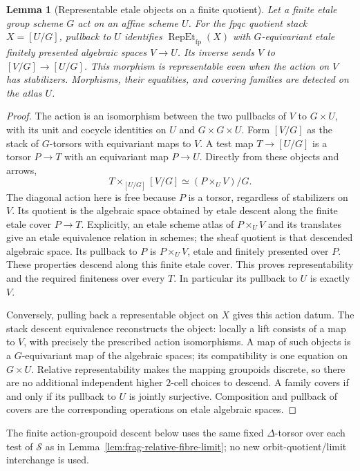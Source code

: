 \documentclass[11pt]{article}
\newtheorem{lemma}[theorem]{Lemma}
\theoremstyle{definition}
\theoremstyle{remark}
\begin{document}
\begin{lemma}[Representable etale objects on a finite quotient]
\label{lem:frag-finite-quotient-etale-descent}
Let a finite etale group scheme $G$ act on an affine scheme $U$.
For the fpqc quotient stack $X=[U/G]$, pullback to $U$ identifies
$\operatorname{RepEt}_{\mathrm{fp}}(X)$ with $G$-equivariant etale
finitely presented algebraic spaces $V\to U$.  Its inverse sends
$V$ to $[V/G]\to[U/G]$.  This morphism is representable even when
the action on $V$ has stabilizers.  Morphisms, their equalities,
and covering families are detected on the atlas $U$.
\end{lemma}
\begin{proof}
The action is an isomorphism between the two pullbacks of $V$ to
$G\times U$, with its unit and cocycle identities on $U$ and
$G\times G\times U$.  Form $[V/G]$ as the stack of $G$-torsors
with equivariant maps to $V$.  A test map $T\to[U/G]$ is a torsor
$P\to T$ with an equivariant map $P\to U$.  Directly from these
objects and arrows,
\[
 T\times_{[U/G]}[V/G]\simeq (P\times_U V)/G.
\]
The diagonal action here is free because $P$ is a torsor, regardless
of stabilizers on $V$.  Its quotient is the algebraic space obtained
by etale descent along the finite etale cover $P\to T$.
Explicitly, an etale scheme atlas of $P\times_UV$ and its translates
give an etale equivalence relation in schemes; the sheaf quotient
is that descended algebraic space.  Its pullback to $P$ is
$P\times_U V$, etale and finitely presented over $P$.  These
properties descend along this finite etale cover.  This proves
representability and the required finiteness over every $T$.
In particular its pullback to $U$ is exactly $V$.

Conversely, pulling back a representable object on $X$ gives this
action datum.  The stack descent equivalence reconstructs the object:
locally a lift consists of a map to $V$, with precisely the prescribed
action isomorphisms.  A map of such objects is a $G$-equivariant map
of the algebraic spaces; its compatibility is one equation on
$G\times U$.  Relative representability makes the mapping groupoids
discrete, so there are no additional independent higher $2$-cell
choices to descend.  A family covers if and only if its pullback
to $U$ is jointly surjective.  Composition and pullback of covers
are the corresponding operations on etale algebraic spaces.
\end{proof}

The finite action-groupoid descent below uses the same fixed
$\Delta$-torsor over each test of $\mathscr S$ as in
Lemma~\ref{lem:frag-relative-fibre-limit}; no new orbit-quotient/limit
interchange is used.
\end{document}
